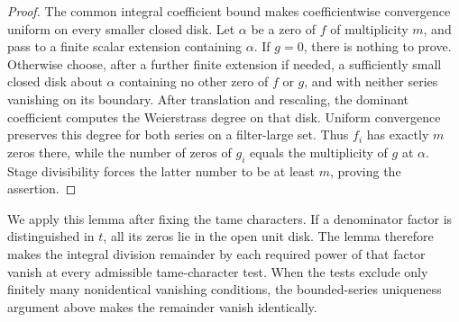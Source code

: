 \begin{proof}
The common integral coefficient bound makes coefficientwise convergence
uniform on every smaller closed disk. Let \(\alpha\) be a zero of \(f\)
of multiplicity \(m\), and pass to a finite scalar extension containing
\(\alpha\). If \(g=0\), there is nothing to prove. Otherwise choose,
after a further finite extension if needed, a sufficiently small closed
disk about \(\alpha\) containing no
other zero of \(f\) or \(g\), and with neither series vanishing on its
boundary. After translation and rescaling, the dominant coefficient
computes the Weierstrass degree on that disk. Uniform convergence
preserves this degree for both series on a filter-large set. Thus \(f_i\)
has exactly \(m\) zeros there, while the number of zeros of \(g_i\) equals
the multiplicity of \(g\) at \(\alpha\). Stage divisibility forces the
latter number to be at least \(m\), proving the assertion.
\end{proof}

We apply this lemma after fixing the tame characters. If a denominator
factor is distinguished in \(t\), all its zeros lie in the open unit
disk. The lemma therefore makes the integral division remainder by each
required power of that factor vanish at every admissible tame-character
test. When the tests exclude only finitely many nonidentical vanishing
conditions, the bounded-series uniqueness argument above makes the
remainder vanish identically.
